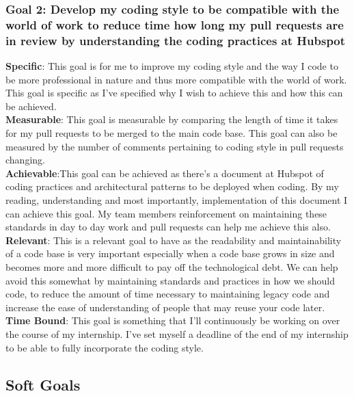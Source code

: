\documentclass[12pt]{article} %
\begin{document}
\subsubsection{Goal 2: Develop my coding style to be compatible with the world of work to reduce time how long my pull requests are in review by understanding the coding practices at Hubspot}
\textbf{Specific}: This goal is for me to improve my coding style and the way I code to be more professional in nature and thus more compatible with the world of work. This goal is specific as I've specified why I wish to achieve this and how this can be achieved. 
\\ \textbf{Measurable}: This goal is measurable by comparing the length of time it takes for my pull requests to be merged to the main code base.  This goal can also be measured by the number of comments pertaining to coding style in pull requests changing.
\\ \textbf{Achievable}:This goal can be achieved as there's a document at Hubspot of coding practices and architectural patterns to be deployed when coding.  By my reading,  understanding and most importantly,  implementation of this document I can achieve this goal.  My team members reinforcement on maintaining these standards in day to day work and pull requests can help me achieve this also.
\\ \textbf{Relevant}: This is a relevant goal to have as the readability and maintainability of a code base is very important especially when a code base grows in size and becomes more and more difficult to pay off the technological debt.  We can help avoid this somewhat by maintaining standards and practices in how we should code,  to reduce the amount of time necessary to maintaining legacy code and increase the ease of understanding of people that may reuse your code later.
\\ \textbf{Time Bound}: This goal is something that I'll continuously be working on over the course of my internship.  I've set myself a deadline of the end of my internship to be able to fully incorporate the coding style.
\subsection{Soft Goals}
\end{document}
